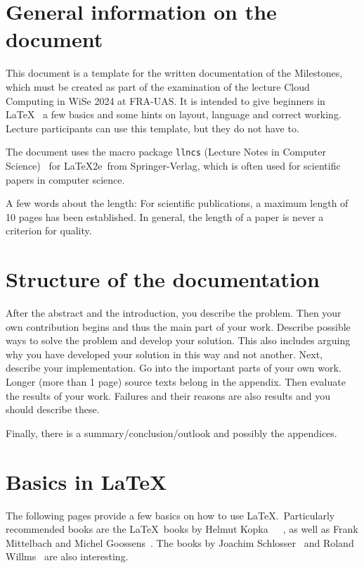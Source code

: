 \documentclass{llncs}
\begin{document}
\section{General information on the document}

This document is a template for the written documentation of the Milestones, which must be created as part of the examination of the lecture Cloud Computing in WiSe 2024 at FRA-UAS. It is intended to give beginners in \LaTeX~\cite{LaTeXWeb} a few basics and some hints on layout, language and correct working. Lecture participants can use this template, but they do not have to. 

The document uses the macro package \texttt{llncs} (Lecture Notes in Computer Science)~\cite{SpringerWeb} for \LaTeX2e\ from Springer-Verlag, which is often used for scientific papers in computer science.

A few words about the length: For scientific publications, a maximum length of 10 pages has been established. In general, the length of a paper is never a criterion for quality.


\section{Structure of the documentation}

After the abstract and the introduction, you describe the problem. 
Then your own contribution begins and thus the main part of your work. Describe possible ways to solve the problem and develop your solution. This also includes arguing why you have developed your solution in this way and not another. Next, describe your implementation. Go into the important parts of your own work. Longer (more than 1 page) source texts belong in the appendix. Then evaluate the results of your work. Failures and their reasons are also results and you should describe these. 

Finally, there is a summary/conclusion/outlook and possibly the appendices. 

\section{Basics in \LaTeX}

The following pages provide a few basics on how to use \LaTeX.~Particularly recommended books are the \LaTeX~books by Helmut Kopka~\cite{LaTeXKopka1}~\cite{LaTeXKopka2}~\cite{LaTeXKopka3}, as well as Frank Mittelbach and Michel Goossens~\cite{LaTeXBegleiter}. The books by Joachim Schlosser~\cite{LaTeXWissenschaftlich} and Roland Willms~\cite{LaTeXSchnelleinsteiger} are also interesting.
\end{document}
